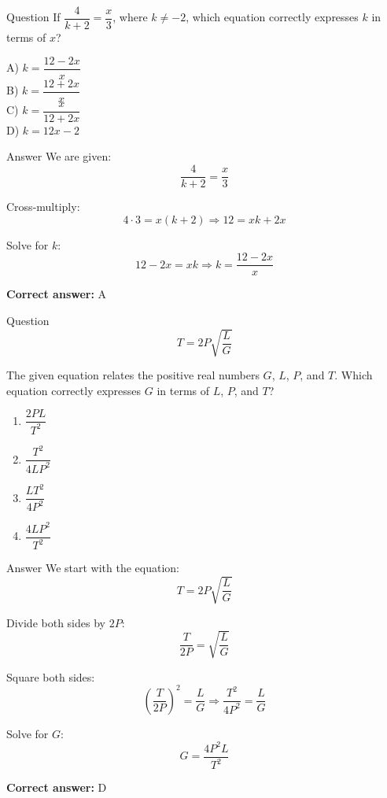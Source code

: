 \documentclass{beamer}
\begin{document}
\begin{frame}{Question}
If $\dfrac{4}{k + 2} = \dfrac{x}{3}$, where $k \ne -2$, which equation correctly expresses $k$ in terms of $x$?

\vspace{2em}

A) $k = \dfrac{12 - 2x}{x}$ \\
B) $k = \dfrac{12 + 2x}{x}$ \\
C) $k = \dfrac{x}{12 + 2x}$ \\
D) $k = 12x - 2$
\end{frame}


\begin{frame}{Answer}
We are given:
\[
\frac{4}{k + 2} = \frac{x}{3}
\]

Cross-multiply:
\[
4 \cdot 3 = x(k + 2) \Rightarrow 12 = xk + 2x
\]

Solve for $k$:
\[
12 - 2x = xk \Rightarrow k = \frac{12 - 2x}{x}
\]

\textbf{Correct answer:} A
\end{frame}

\begin{frame}{Question}
\[
T = 2P \sqrt{\frac{L}{G}}
\]

The given equation relates the positive real numbers $G$, $L$, $P$, and $T$. Which equation correctly expresses $G$ in terms of $L$, $P$, and $T$?

\begin{enumerate}
  \renewcommand{\labelenumi}{\Alph{enumi})}
  \item[A] $\dfrac{2PL}{T^2}$
  \item[B] $\dfrac{T^2}{4LP^2}$
  \item[C] $\dfrac{LT^2}{4P^2}$
  \item[D] $\dfrac{4LP^2}{T^2}$
\end{enumerate}
\end{frame}


\begin{frame}{Answer}
We start with the equation:
\[
T = 2P \sqrt{\frac{L}{G}}
\]

Divide both sides by $2P$:
\[
\frac{T}{2P} = \sqrt{\frac{L}{G}}
\]

Square both sides:
\[
\left( \frac{T}{2P} \right)^2 = \frac{L}{G}
\Rightarrow \frac{T^2}{4P^2} = \frac{L}{G}
\]

Solve for $G$:
\[
G = \frac{4P^2 L}{T^2}
\]

\textbf{Correct answer:} D
\end{frame}
\end{document}
